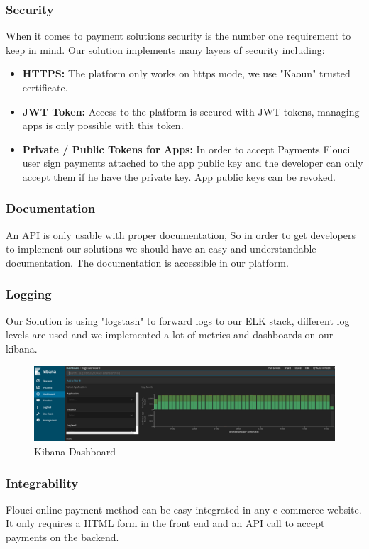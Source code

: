 \begin{spacing}{1.2}
\subsubsection{Security}
When it comes to payment solutions security is the number one requirement to keep in mind.
Our solution implements many layers of security including: 
\begin{itemize}
	\item \textbf{HTTPS:} The platform only works on https mode, we use "Kaoun" trusted certificate.
	\item \textbf{JWT Token\cite{JWT}:}  Access to the platform is secured with JWT tokens, managing apps is only possible with this token.
	\item \textbf{Private / Public Tokens for Apps:}  In order to accept Payments Flouci user sign payments attached to the app public key and the developer can only accept them if he have the private key.
	App public keys can be revoked.
\end{itemize}
\subsubsection{Documentation}
An API is only usable with proper documentation, So in order to get developers to implement our solutions we should have an easy and understandable documentation. The documentation is accessible in our platform.
\subsubsection{Logging}
Our Solution is using "logstash" to forward logs to our ELK\cite{ELK} stack, different log levels are used and we implemented a lot of metrics and dashboards on our kibana.

\begin{figure}[H]\centering
\includegraphics[scale=0.3]{ELK.png}
\caption{Kibana Dashboard}
\label{fig:usecasediagram}
\end{figure}

\subsubsection{Integrability}
Flouci online payment method can be easy integrated in any e-commerce website. It only requires a HTML form in the front end and an API call to accept payments on the backend.


\end{spacing}
